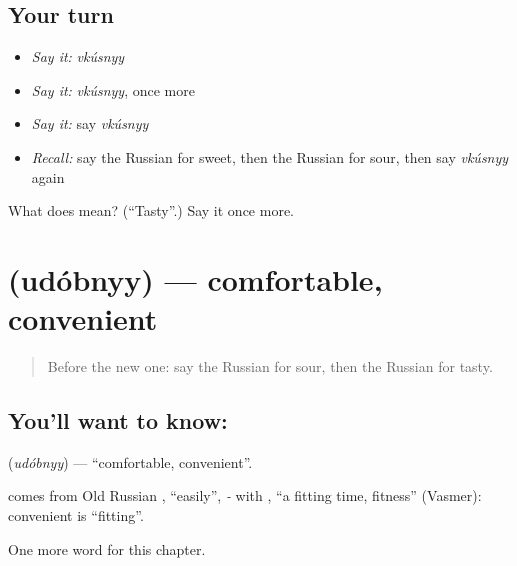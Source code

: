 \subsection*{Your turn}
\begin{itemize}
\raggedright
  \item \emph{Say it:} \emph{vkúsnyy}
  \item \emph{Say it:} \emph{vkúsnyy}, once more
  \item \emph{Say it:} say \emph{vkúsnyy}
  \item \emph{Recall:} say the Russian for sweet, then the Russian for sour, then say \emph{vkúsnyy} again
\end{itemize}

\begin{tcolorbox}[breakable,colback=teal!4,colframe=teal!35!black,title={Before you move on}]
What does  mean? (\textquotedblleft{}Tasty\textquotedblright{}.) Say it once more.
\end{tcolorbox}
\section[\texorpdfstring{\ru{удобный} (udóbnyy)}{удобный (udóbnyy)}]{ (udóbnyy) — comfortable, convenient}

\label{lesson:RU-C157-udobnyy}



\begin{quote}
Before the new one: say the Russian for sour, then the Russian for tasty.
\end{quote}

\subsection*{You'll want to know: }
\textbf{} (\emph{udóbnyy}) — \textquotedblleft{}comfortable, convenient\textquotedblright{}.

\begin{cousinweb}
\textbf{} comes from Old Russian \emph{}, \textquotedblleft{}easily\textquotedblright{}, \emph{-} with \emph{}, \textquotedblleft{}a fitting time, fitness\textquotedblright{} (Vasmer): convenient is \textquotedblleft{}fitting\textquotedblright{}.
\end{cousinweb}

\begin{grammarlens}[title={What you've built}]
One more word for this chapter.
\end{grammarlens}

